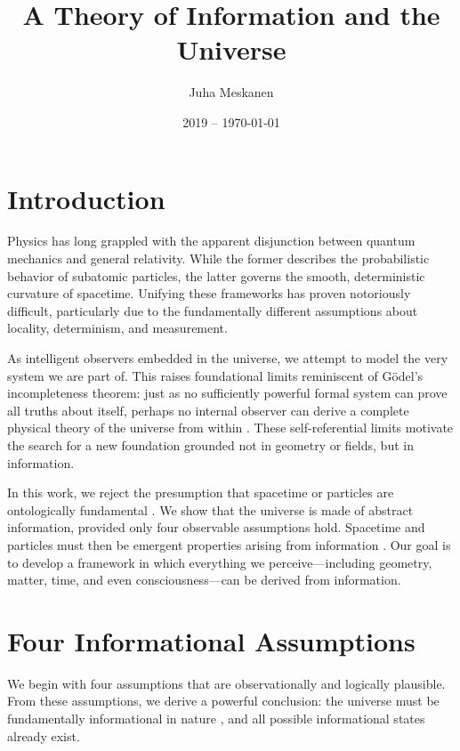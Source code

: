 \documentclass[11pt]{article}
\title{\LARGE A Theory of Information and the Universe}
\author{Juha Meskanen}
\date{2019 -- \today}
\begin{document}
\maketitle

\section{Introduction}

Physics has long grappled with the apparent disjunction between quantum mechanics and general relativity. While the former describes the probabilistic behavior of subatomic particles, the latter governs the smooth, deterministic curvature of spacetime. Unifying these frameworks has proven notoriously difficult, particularly due to the fundamentally different assumptions about locality, determinism, and measurement.

As intelligent observers embedded in the universe, we attempt to model the very system we are part of. This raises foundational limits reminiscent of Gödel's incompleteness theorem: just as no sufficiently powerful formal system can prove all truths about itself, perhaps no internal observer can derive a complete physical theory of the universe from within \cite{dyson2004godel}. These self-referential limits motivate the search for a new foundation grounded not in geometry or fields, but in information.

In this work, we reject the presumption that spacetime or particles are ontologically fundamental \cite{wheeler1990it} . We show that the universe is made of abstract information, provided only four observable assumptions hold. Spacetime and particles must then be emergent properties arising from information \cite{zuse1970calculating} \cite{tegmark2008mathematical}. Our goal is to develop a framework in which everything we perceive—including geometry, matter, time, and even consciousness—can be derived from information.

\section{Four Informational Assumptions}

We begin with four assumptions that are observationally and logically plausible. From these assumptions, we derive a powerful conclusion: the universe must be fundamentally informational in nature \cite{tegmark2008mathematical} \cite{wheeler1990it}, and all possible informational states already exist.
\end{document}

